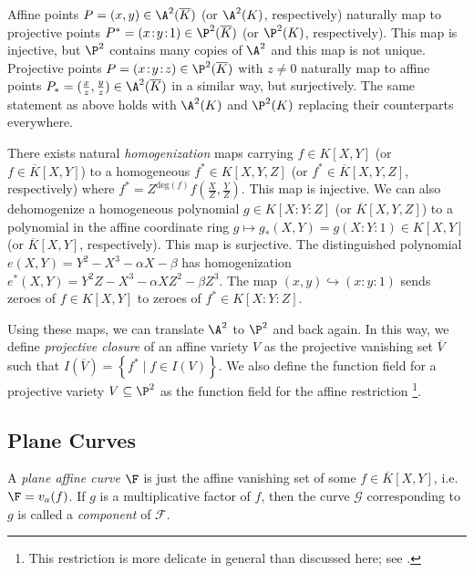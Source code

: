 \documentclass[11pt,letterpaper]{article}
\newcommand{\polys}{K[X,Y]}
\newcommand{\hpolys}{K[X\!:\!Y\!:\!Z]}
\theoremstyle{definition}
\newcommand{\6}{\mathbf}
\newcommand{\7}{\mathcal}
\begin{document}
Affine points $P=(x,y) \in \A^2(\overline{K})$ (or $\A^2(K)$, respectively) naturally map to projective points $P^*=(x\!:\!y\!:\!1) \in \P^2(\overline{K})$ (or $\P^2(K)$, respectively). This map is injective, but $\P^2$ contains many copies of $\A^2$ and this map is not unique. Projective points $P=(x\!:\!y\!:\!z) \in \P^2(\overline{K})$ with $z \neq 0$ naturally map to affine points $P_*=(\frac{x}{z}, \frac{y}{z}) \in \A^2(\overline{K})$ in a similar way, but surjectively. The same statement as above holds with $\A^2(K)$ and $\P^2(K)$ replacing their counterparts everywhere.

There exists natural \textit{homogenization} maps carrying $f \in \polys$ (or $f \in \overline{K}[X,Y]$) to a homogeneous $f^* \in K[X,Y,Z]$ (or $f^* \in \overline{K}[X,Y,Z]$, respectively) where $f^* = Z^{\text{deg}(f)}f(\frac{X}{Z}, \frac{Y}{Z})$. This map is injective.
We can also dehomogenize a homogeneous polynomial $g \in \hpolys$ (or $\overline{K}[X,Y,Z]$) to a polynomial in the affine coordinate ring $g \mapsto g_*(X,Y) = g(X\!:\!Y\!:\!1) \in \polys$ (or $\overline{K}[X,Y]$, respectively). This map is surjective.
The distinguished polynomial $e(X,Y) = Y^2 - X^3 - \alpha X - \beta$ has homogenization $e^*(X,Y) = Y^2Z - X^3 - \alpha XZ^2 - \beta Z^3$. The map $(x,y) \hookrightarrow (x\!:\!y\!:\!1)$ sends zeroes of $f \in K[X,Y]$ to zeroes of $f^* \in K[X\!:\!Y\!:\!Z]$.

Using these maps, we can translate $\A^2$ to $\P^2$ and back again.  In this way, we define \textit{projective closure} of an affine variety $V$ as the projective vanishing set $\overline{V}$ such that $I(\overline{V}) = \left\{f^* \mid f \in I(V)\right\}$. We also define the function field for a projective variety $V \subseteq \P^2$ as the function field for the affine restriction \footnote{This restriction is more delicate in general than discussed here; see \cite{Silverman}.}.


\subsection{Plane Curves}
\label{sec:planecurve}

A \textit{plane affine curve} $\F$ is just the affine vanishing set of some $f \in \overline{K}[X,Y]$, i.e.\ $\F = v_a(f)$.  If $g$ is a multiplicative factor of $f$, then the curve $\mathcal{G}$ corresponding to $g$ is called a \textit{component} of $\mathcal{F}$.
\end{document}
